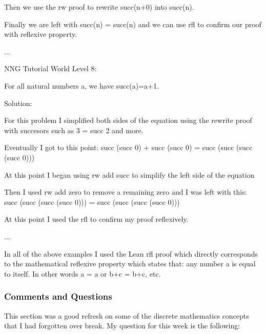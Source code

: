 \documentclass{article}
\theoremstyle{theorem}
\theoremstyle{definition}
\theoremstyle{remark}
\begin{document}
Then we use the rw proof to rewrite succ(n+0) into succ(n).

Finally we are left with succ(n) = succ(n) and we can use rfl to confirm our proof with reflexive property.

...

NNG Tutorial World Level 8:

For all natural numbers a, we have succ(a)=a+1.

Solution: 

For this problem I simplified both sides of the equation using the rewrite proof with succesors such as 3 = succ 2 and more.

Eventually I got to this point: succ (succ 0) + succ (succ 0) = succ (succ (succ (succ 0)))

At this point I began using rw add succ to simplify the left side of the equation

Then I used rw add zero to remove a remaining zero and I was left with this: succ (succ (succ (succ 0))) = succ (succ (succ (succ 0)))

At this point I used the rfl to confirm my proof reflexively.

...

In all of the above examples I used the Lean rfl proof which directly corresponds to the mathematical reflexive property which states that:
any number a is equal to itself. In other words a = a or b+c = b+c, etc.


%
%

\subsubsection*{Comments and Questions}

This section was a good refresh on some of the discrete mathematics concepts that I had forgotten over break. My question for this week is the following:
\end{document}
